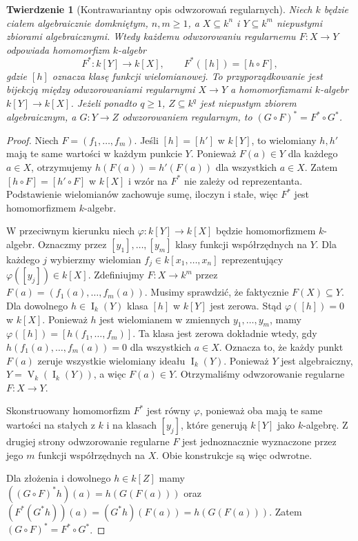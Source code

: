 \documentclass[11pt,a4paper,openany]{report}
\numberwithin{equation}{section}
\theoremstyle{plain}
\newtheorem{twierdzenie}{Twierdzenie}[section]
\theoremstyle{definition}
\theoremstyle{remark}
\newcommand{\V}{\operatorname V}
\newcommand{\I}{\operatorname I}
\begin{document}
\begin{twierdzenie}[Kontrawariantny opis odwzorowań regularnych]
\label{tw:affine-morphism}
Niech $k$ będzie ciałem algebraicznie domkniętym, $n,m\ge1$,
a $X\subseteq k^n$ i $Y\subseteq k^m$ niepustymi zbiorami
algebraicznymi. Wtedy każdemu odwzorowaniu regularnemu
$F:X\to Y$ odpowiada homomorfizm $k$-algebr
\[
F^*:k[Y]\longrightarrow k[X],\qquad
F^*([h])=[h\circ F],
\]
gdzie $[h]$ oznacza klasę funkcji wielomianowej.
To przyporządkowanie jest bijekcją między
odwzorowaniami regularnymi $X\to Y$ a homomorfizmami
$k$-algebr $k[Y]\to k[X]$.
Jeżeli ponadto $q\ge1$, $Z\subseteq k^q$ jest niepustym
zbiorem algebraicznym, a $G:Y\to Z$ odwzorowaniem regularnym,
to $(G\circ F)^*=F^*\circ G^*$.
\end{twierdzenie}
\begin{proof}
Niech $F=(f_1,\dots,f_m)$.
Jeśli $[h]=[h']$ w $k[Y]$, to wielomiany $h,h'$ mają
te same wartości w każdym punkcie $Y$. Ponieważ $F(a)\in Y$
dla każdego $a\in X$, otrzymujemy
$h(F(a))=h'(F(a))$ dla wszystkich $a\in X$.
Zatem $[h\circ F]=[h'\circ F]$ w $k[X]$ i wzór na $F^*$
nie zależy od reprezentanta.
Podstawienie wielomianów zachowuje sumę, iloczyn i stałe,
więc $F^*$ jest homomorfizmem $k$-algebr.

W przeciwnym kierunku niech
$\varphi:k[Y]\to k[X]$ będzie homomorfizmem $k$-algebr.
Oznaczmy przez $[y_1],\dots,[y_m]$ klasy funkcji współrzędnych
na $Y$. Dla każdego $j$ wybierzmy wielomian
$f_j\in k[x_1,\dots,x_n]$ reprezentujący
$\varphi([y_j])\in k[X]$.
Zdefiniujmy $F:X\to k^m$ przez
$F(a)=(f_1(a),\dots,f_m(a))$.
Musimy sprawdzić, że faktycznie $F(X)\subseteq Y$.
Dla dowolnego $h\in\I_k(Y)$ klasa $[h]$ w $k[Y]$ jest zerowa.
Stąd $\varphi([h])=0$ w $k[X]$.
Ponieważ $h$ jest wielomianem w zmiennych $y_1,\dots,y_m$,
mamy $\varphi([h])=[h(f_1,\dots,f_m)]$.
Ta klasa jest zerowa dokładnie wtedy, gdy
$h(f_1(a),\dots,f_m(a))=0$ dla wszystkich $a\in X$.
Oznacza to, że każdy punkt $F(a)$ zeruje wszystkie wielomiany
ideału $\I_k(Y)$. Ponieważ $Y$ jest algebraiczny,
$Y=\V_k(\I_k(Y))$, a więc $F(a)\in Y$.
Otrzymaliśmy odwzorowanie regularne $F:X\to Y$.

Skonstruowany homomorfizm $F^*$ jest równy $\varphi$,
ponieważ oba mają te same wartości na stałych z $k$
i na klasach $[y_j]$, które generują $k[Y]$ jako $k$-algebrę.
Z drugiej strony odwzorowanie regularne $F$ jest jednoznacznie
wyznaczone przez jego $m$ funkcji współrzędnych na $X$.
Obie konstrukcje są więc odwrotne.

Dla złożenia i dowolnego $h\in k[Z]$ mamy
$((G\circ F)^*h)(a)=h(G(F(a)))$
oraz $(F^*(G^*h))(a)=(G^*h)(F(a))=h(G(F(a)))$.
Zatem $(G\circ F)^*=F^*\circ G^*$.
\end{proof}
\end{document}
